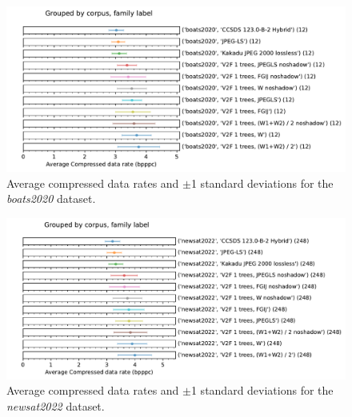 \documentclass{class/technicalReportUAB}
\begin{document}
\begin{figure}[h]
\begin{center}
\includegraphics[width=0.9\linewidth]{./plots/lossless/boats_bpppc_histogram.pdf}
\end{center}
\caption{Average compressed data rates and $\pm$1 standard deviations for the \textit{boats2020} dataset.}
\label{fig:lossless_bpppc_boats}
\end{figure}

\begin{figure}[h]
\begin{center}
\includegraphics[width=0.9\linewidth]{./plots/lossless/newsat_bpppc_histogram.pdf}
\end{center}
\caption{Average compressed data rates and $\pm$1 standard deviations for the \textit{newsat2022} dataset.}
\label{fig:lossless_bpppc_newsat}
\end{figure}
\end{document}
